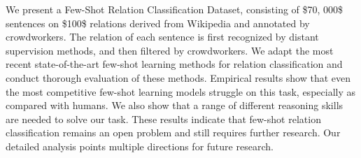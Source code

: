 We present a Few-Shot Relation Classification Dataset, consisting of \$70, 000\$ sentences on \$100\$ relations derived from Wikipedia and annotated by crowdworkers. The relation of each sentence is first recognized by distant supervision methods, and then filtered by crowdworkers. We adapt the most recent state-of-the-art few-shot learning methods for relation classification and conduct thorough evaluation of these methods. Empirical results show that even the most competitive few-shot learning models struggle on this task, especially as compared with humans. We also show that a range of different reasoning skills are needed to solve our task. These results indicate that few-shot relation classification remains an open problem and still requires further research. Our detailed analysis points multiple directions for future research.
